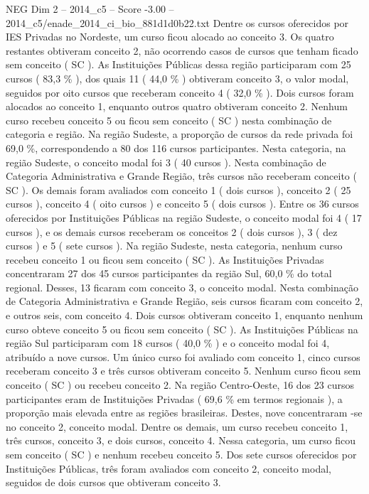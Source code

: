 \begin{textsample}{NEG Dim 2 – 2014\_c5 – Score -3.00 – 2014\_c5/enade\_2014\_ci\_bio\_881d1d0b22.txt}
Dentre os cursos oferecidos por IES Privadas no Nordeste, um curso ficou alocado ao conceito 3.
Os quatro restantes obtiveram conceito 2, não ocorrendo casos de cursos que tenham ficado sem conceito ( SC ).
As Instituições Públicas dessa região participaram com 25 cursos ( 83,3 \% ), dos quais 11 ( 44,0 \% ) obtiveram conceito 3, o valor modal, seguidos por oito cursos que receberam conceito 4 ( 32,0 \% ).
Dois cursos foram alocados ao conceito 1, enquanto outros quatro obtiveram conceito 2.
Nenhum curso recebeu conceito 5 ou ficou sem conceito ( SC ) nesta combinação de categoria e região.
Na região Sudeste, a proporção de cursos da rede privada foi 69,0 \%, correspondendo a 80 dos 116 cursos participantes.
Nesta categoria, na região Sudeste, o conceito modal foi 3 ( 40 cursos ).
Nesta combinação de Categoria Administrativa e Grande Região, três cursos não receberam conceito ( SC ).
Os demais foram avaliados com conceito 1 ( dois cursos ), conceito 2 ( 25 cursos ), conceito 4 ( oito cursos ) e conceito 5 ( dois cursos ).
Entre os 36 cursos oferecidos por Instituições Públicas na região Sudeste, o conceito modal foi 4 ( 17 cursos ), e os demais cursos receberam os conceitos 2 ( dois cursos ), 3 ( dez cursos ) e 5 ( sete cursos ).
Na região Sudeste, nesta categoria, nenhum curso recebeu conceito 1 ou ficou sem conceito ( SC ).
As Instituições Privadas concentraram 27 dos 45 cursos participantes da região Sul, 60,0 \% do total regional.
Desses, 13 ficaram com conceito 3, o conceito modal.
Nesta combinação de Categoria Administrativa e Grande Região, seis cursos ficaram com conceito 2, e outros seis, com conceito 4.
Dois cursos obtiveram conceito 1, enquanto nenhum curso obteve conceito 5 ou ficou sem conceito ( SC ).
As Instituições Públicas na região Sul participaram com 18 cursos ( 40,0 \% ) e o conceito modal foi 4, atribuído a nove cursos.
Um único curso foi avaliado com conceito 1, cinco cursos receberam conceito 3 e três cursos obtiveram conceito 5.
Nenhum curso ficou sem conceito ( SC ) ou recebeu conceito 2.
Na região Centro-Oeste, 16 dos 23 cursos participantes eram de Instituições Privadas ( 69,6 \% em termos regionais ), a proporção mais elevada entre as regiões brasileiras.
Destes, nove concentraram -se no conceito 2, conceito modal.
Dentre os demais, um curso recebeu conceito 1, três cursos, conceito 3, e dois cursos, conceito 4.
Nessa categoria, um curso ficou sem conceito ( SC ) e nenhum recebeu conceito 5.
Dos sete cursos oferecidos por Instituições Públicas, três foram avaliados com conceito 2, conceito modal, seguidos de dois cursos que obtiveram conceito 3.

\end{textsample}
